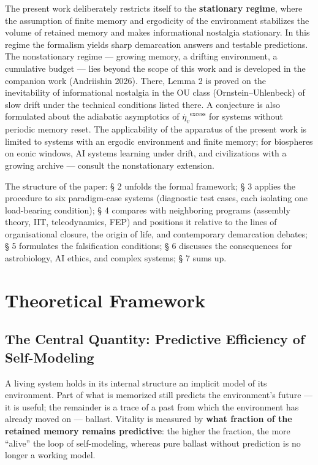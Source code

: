 \documentclass[pdflatex,sn-mathphys-ay]{sn-jnl}
\begin{document}
The present work deliberately restricts itself to the \textbf{stationary regime}, where the assumption of finite memory and ergodicity of the environment stabilizes the volume of retained memory and makes informational nostalgia stationary. In this regime the formalism yields sharp demarcation answers and testable predictions. The nonstationary regime --- growing memory, a drifting environment, a cumulative budget --- lies beyond the scope of this work and is developed in the companion work (Andriishin 2026). There, Lemma 2 is proved on the inevitability of informational nostalgia in the OU class (Ornstein--Uhlenbeck) of slow drift under the technical conditions listed there. A conjecture is also formulated about the adiabatic asymptotics of \(\dot{\eta_v}^{\text{excess}}\) for systems without periodic memory reset. The applicability of the apparatus of the present work is limited to systems with an ergodic environment and finite memory; for biospheres on eonic windows, AI systems learning under drift, and civilizations with a growing archive --- consult the nonstationary extension.

The structure of the paper: § 2 unfolds the formal framework; § 3 applies the procedure to six paradigm-case systems (diagnostic test cases, each isolating one load-bearing condition); § 4 compares with neighboring programs (assembly theory, IIT, teleodynamics, FEP) and positions it relative to the lines of organisational closure, the origin of life, and contemporary demarcation debates; § 5 formulates the falsification conditions; § 6 discusses the consequences for astrobiology, AI ethics, and complex systems; § 7 sums up.

\section{Theoretical Framework}\label{theoretical-framework}

\subsection{The Central Quantity: Predictive Efficiency of Self-Modeling}\label{the-central-quantity-predictive-efficiency-of-self-modeling}

A living system holds in its internal structure an implicit model of its environment. Part of what is memorized still predicts the environment's future --- it is useful; the remainder is a trace of a past from which the environment has already moved on --- ballast. Vitality is measured by \textbf{what fraction of the retained memory remains predictive}: the higher the fraction, the more ``alive'' the loop of self-modeling, whereas pure ballast without prediction is no longer a working model.
\end{document}
